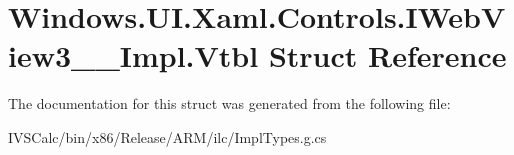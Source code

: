 \hypertarget{struct_windows_1_1_u_i_1_1_xaml_1_1_controls_1_1_i_web_view3_____impl_1_1_vtbl}{}\section{Windows.\+U\+I.\+Xaml.\+Controls.\+I\+Web\+View3\+\_\+\+\_\+\+Impl.\+Vtbl Struct Reference}
\label{struct_windows_1_1_u_i_1_1_xaml_1_1_controls_1_1_i_web_view3_____impl_1_1_vtbl}


The documentation for this struct was generated from the following file\+:\begin{DoxyCompactItemize}
\item 
I\+V\+S\+Calc/bin/x86/\+Release/\+A\+R\+M/ilc/Impl\+Types.\+g.\+cs\end{DoxyCompactItemize}
